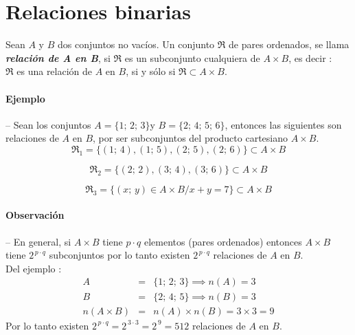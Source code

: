 \documentclass{article}
\begin{document}
\section*{Relaciones binarias}

\noindent Sean $A$ y $B$ dos conjuntos no vacíos. Un conjunto $\Re$ de pares ordenados, se llama \emph{\textbf{relación de A en B}}, si $\Re$ es un subconjunto cualquiera de $A\times B$, es decir : \\

$\Re$ es una relación de $A$ en $B$, si y sólo si $\Re \subset A\times B$.

\paragraph*{Ejemplo} -- Sean los conjuntos $A = \{1;\,2;\,3\}$\quad y \quad$B = \{2;\,4;\,5;\,6\}$, entonces las siguientes son relaciones  de $A$ en $B$, por ser subconjuntos del producto cartesiano $A\times B$.
$$
\Re_{1} = \{(1;\,4), (1;\,5), (2;\,5), (2;\,6)\} \subset A\!\times\!B
$$

$$
\Re_{2} = \{(2;\,2), (3;\,4), (3;\,6)\} \subset A\!\times\!B
$$

$$
\Re_{3} = \{(x;\,y) \in A\times B / x + y = 7\} \subset A\!\times\!B
$$

\paragraph*{Observación} -- En general, si $A\!\times\!B$ tiene $p\cdot q$ elementos (pares ordenados) entonces $A\!\times\!B$ tiene $2^{\,p\cdot q}$ subconjuntos por lo tanto existen $2^{\,p\cdot q}$ relaciones de $A$ en $B$. \\

\noindent Del ejemplo : 
\begin{eqnarray*}
A &=& \{1;\,2;\,3\} \implies n(A) = 3 \\
B &=& \{2;\,4;\,5\} \implies n(B) = 3 \\
n(A\times B) &=& n(A) \times n(B) = 3\times 3 = 9
\end{eqnarray*}
Por lo tanto existen $2^{\,p\cdot q} = 2^{\,3\cdot3} = 2^{\,9} = 512$ relaciones de $A$ en $B$.
\end{document}
